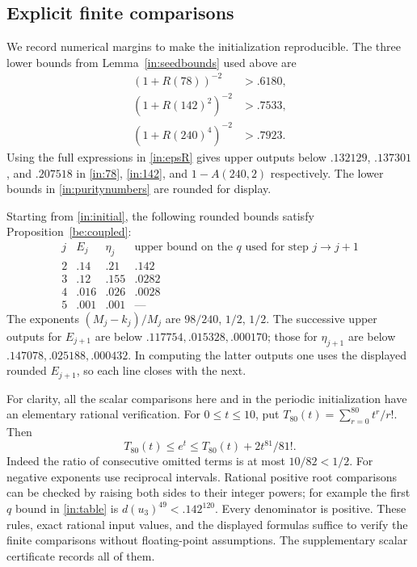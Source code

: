 \subsection{Explicit finite comparisons}
We record numerical margins to make the initialization reproducible.
The three lower bounds from Lemma~\ref{in:seedbounds} used above are
\begin{equation}\label{in:puritynumbers}
 \begin{split}
 (1+R(78))^{-2}&>.6180,\\
 (1+R(142)^2)^{-2}&>.7533,\\
 (1+R(240)^4)^{-2}&>.7923.
 \end{split}
\end{equation}
Using the full expressions in \eqref{in:epsR} gives upper outputs below
$.132129$, $.137301$, and $.207518$ in \eqref{in:78}, \eqref{in:142},
and $1-A(240,2)$ respectively. The lower bounds in
\eqref{in:puritynumbers} are rounded for display.

Starting from \eqref{in:initial}, the following rounded bounds satisfy
Proposition~\ref{be:coupled}:
\begin{equation}\label{in:table}
\begin{array}{c|cc|c}
 j&E_j&\eta_j&\text{upper bound on the $q$ used for step $j\to j+1$}\\\hline
 2&.14&.21&.142\\
 3&.12&.155&.0282\\
 4&.016&.026&.0028\\
 5&.001&.001&\text{---}
\end{array}
\end{equation}
The exponents $(M_j-k_j)/M_j$ are $98/240$, $1/2$, $1/2$.
The successive upper outputs for $E_{j+1}$ are below
$.117754,.015328,.000170$; those for $\eta_{j+1}$ are below
$.147078,.025188,.000432$. In computing the latter outputs one uses
the displayed rounded $E_{j+1}$, so each line closes with the next.

For clarity, all the scalar comparisons here and in the periodic
initialization have an elementary rational verification. For
$0\le t\le10$, put $T_{80}(t)=\sum_{r=0}^{80}t^r/r!$. Then
\begin{equation}\label{in:exp-enclosure}
 T_{80}(t)\le e^t\le T_{80}(t)+2t^{81}/81!.
\end{equation}
Indeed the ratio of consecutive omitted terms is at most $10/82<1/2$.
For negative exponents use reciprocal intervals. Rational positive
root comparisons can be checked by raising both sides to their
integer powers; for example the first $q$ bound in \eqref{in:table}
is $d(u_3)^{49}<.142^{120}$. Every denominator is positive.
These rules, exact rational input values, and the displayed formulas
suffice to verify the finite comparisons without floating-point
assumptions. The supplementary scalar certificate records all of them.

